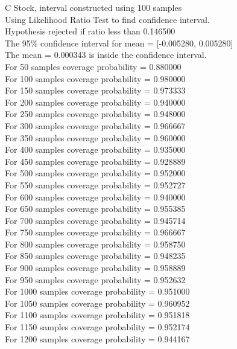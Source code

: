 \documentclass{article}
\begin{document}
C Stock, interval constructed using 100 samples\\
Using Likelihood Ratio Test to find confidence interval.\\
Hypothesis rejected if ratio less than 0.146500\\
The 95\% confidence interval for mean = [-0.005280, 0.005280]\\
The mean = 0.000343 is inside the confidence interval.\\
For 50 samples coverage probability = 0.880000\\
For 100 samples coverage probability = 0.980000\\
For 150 samples coverage probability = 0.973333\\
For 200 samples coverage probability = 0.940000\\
For 250 samples coverage probability = 0.948000\\
For 300 samples coverage probability = 0.966667\\
For 350 samples coverage probability = 0.960000\\
For 400 samples coverage probability = 0.935000\\
For 450 samples coverage probability = 0.928889\\
For 500 samples coverage probability = 0.952000\\
For 550 samples coverage probability = 0.952727\\
For 600 samples coverage probability = 0.940000\\
For 650 samples coverage probability = 0.955385\\
For 700 samples coverage probability = 0.945714\\
For 750 samples coverage probability = 0.966667\\
For 800 samples coverage probability = 0.958750\\
For 850 samples coverage probability = 0.948235\\
For 900 samples coverage probability = 0.958889\\
For 950 samples coverage probability = 0.952632\\
For 1000 samples coverage probability = 0.951000\\
For 1050 samples coverage probability = 0.960952\\
For 1100 samples coverage probability = 0.951818\\
For 1150 samples coverage probability = 0.952174\\
For 1200 samples coverage probability = 0.944167\\
\end{document}
